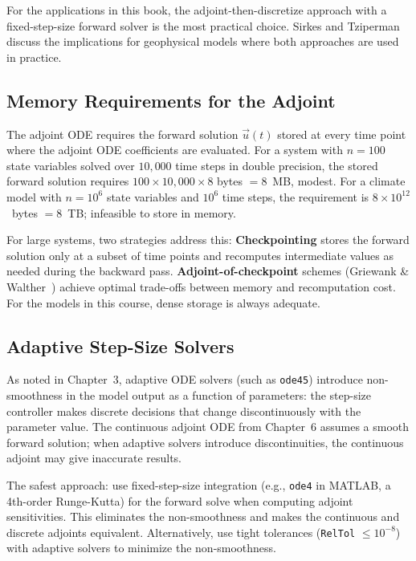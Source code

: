 For the applications in this book, the adjoint-then-discretize approach
with a fixed-step-size forward solver is the most practical choice.
Sirkes and Tziperman~\cite{sirkes1997finite} discuss the implications
for geophysical models where both approaches are used in practice.

\subsection{Memory Requirements for the Adjoint}

The adjoint ODE requires the forward solution $\vec{u}(t)$ stored at
every time point where the adjoint ODE coefficients are evaluated.
For a system with $n = 100$ state variables solved over $10{,}000$
time steps in double precision, the stored forward solution requires
$100 \times 10{,}000 \times 8$ bytes $= 8$~MB, modest.
For a climate model with $n = 10^6$ state variables and $10^6$
time steps, the requirement is $8 \times 10^{12}$~bytes $= 8$~TB;
infeasible to store in memory.

For large systems, two strategies address this:
\textbf{Checkpointing} stores the forward solution only at a subset
of time points and recomputes intermediate values as needed during
the backward pass. \textbf{Adjoint-of-checkpoint} schemes
(Griewank \& Walther~\cite{griewank2008evaluating}) achieve optimal trade-offs
between memory and recomputation cost.
For the models in this course, dense storage is always
adequate.

\subsection{Adaptive Step-Size Solvers}

As noted in Chapter~3, adaptive ODE solvers (such as \texttt{ode45})
introduce non-smoothness in the model output as a function of parameters:
the step-size controller makes discrete decisions that change discontinuously
with the parameter value. The continuous adjoint ODE from Chapter~6
assumes a smooth forward solution; when adaptive solvers introduce
discontinuities, the continuous adjoint may give inaccurate results.

The safest approach: use fixed-step-size integration (e.g., \texttt{ode4}
in MATLAB, a 4th-order Runge-Kutta) for the forward solve when
computing adjoint sensitivities. This eliminates the non-smoothness
and makes the continuous and discrete adjoints equivalent.
Alternatively, use tight tolerances (\texttt{RelTol} $\leq 10^{-8}$)
with adaptive solvers to minimize the non-smoothness.


